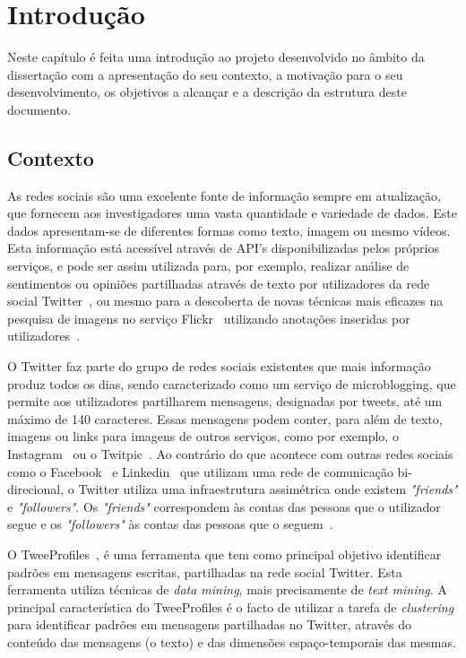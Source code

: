 \chapter{Introdução} \label{chap:intro}

Neste capítulo é feita uma introdução ao projeto desenvolvido no âmbito da dissertação com a apresentação do seu contexto, a motivação para o seu desenvolvimento, os objetivos a alcançar e a descrição da estrutura deste documento.

\section{Contexto}

As redes sociais são uma excelente fonte de informação sempre em atualização, que fornecem aos investigadores uma vasta quantidade e variedade de dados. Este dados apresentam-se de diferentes formas como texto, imagem ou mesmo  vídeos. Esta informação está acessível através de API's disponibilizadas pelos próprios serviços, e pode ser assim utilizada para, por exemplo, realizar análise de sentimentos ou opiniões partilhadas através de texto por utilizadores da rede social Twitter~\cite{Pak2010, twitter}, ou mesmo para a descoberta de novas técnicas mais eficazes na pesquisa de imagens no serviço Flickr~\cite{flickr} utilizando anotações inseridas por utilizadores~\cite{Li2008}.  

O Twitter faz parte do grupo de redes sociais existentes que mais informação produz todos os dias, sendo caracterizado como um serviço de microblogging, que permite aos utilizadores partilharem mensagens, designadas por tweets, até um máximo de 140 caracteres. Essas mensagens podem conter, para além de texto, imagens ou links para imagens de outros serviços, como por exemplo, o Instagram~\cite{instagram} ou o Twitpic~\cite{twitpic}. Ao contrário do que acontece com outras redes sociais como o Facebook~\cite{facebook} e Linkedin~\cite{linkedin} que utilizam uma rede de comunicação bi-direcional, o Twitter utiliza uma infraestrutura assimétrica onde existem \textit{"friends"} e \textit{"followers"}. Os \textit{"friends"} correspondem às contas das pessoas que o utilizador segue e os \textit{"followers"} às contas das pessoas que o seguem~\cite{Russell2011}.

O TweeProfiles~\cite{Cunha2013}, é uma ferramenta que tem como principal objetivo identificar padrões em mensagens escritas, partilhadas na rede social Twitter. Esta ferramenta utiliza técnicas de \textit{data mining}, mais precisamente de \textit{text mining}. A principal característica do TweeProfiles é o facto de utilizar a tarefa de \textit{clustering} para identificar padrões em mensagens partilhadas no Twitter, através do conteúdo das mensagens (o texto) e das dimensões espaço-temporais das mesmas. 

